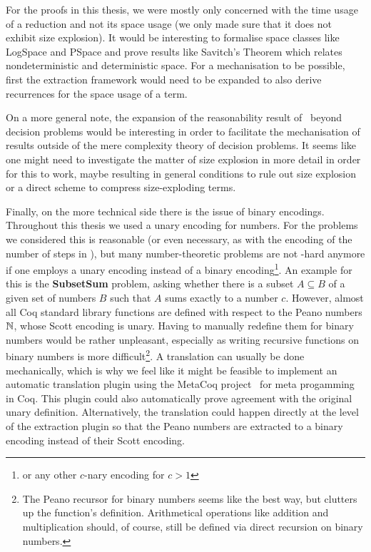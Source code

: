 For the proofs in this thesis, we were mostly only concerned with the time usage of a reduction and not its space usage (we only made sure that it does not exhibit size explosion). It would be interesting to formalise space classes like \textsf{LogSpace} and \textsf{PSpace} and prove results like Savitch's Theorem which relates nondeterministic and deterministic space. For a mechanisation to be possible, first the extraction framework would need to be expanded to also derive recurrences for the space usage of a term.

On a more general note, the expansion of the reasonability result of~\cite{ForsterKunzeRoth:2019:wcbv-Reasonable} beyond decision problems would be interesting in order to facilitate the mechanisation of results outside of the mere complexity theory of decision problems. It seems like one might need to investigate the matter of size explosion in more detail in order for this to work, maybe resulting in general conditions to rule out size explosion or a direct scheme to compress size-exploding terms.

Finally, on the more technical side there is the issue of binary encodings. Throughout this thesis we used a unary encoding for numbers. For the problems we considered this is reasonable (or even necessary, as with the encoding of the number of steps in \gennp{}), but many number-theoretic problems are not \NP{}-hard anymore if one employs a unary encoding instead of a binary encoding\footnote{or any other $c$-nary encoding for $c> 1$}. An example for this is the \textbf{SubsetSum} problem, asking whether there is a subset $A \subseteq B$ of a given set of numbers $B$ such that $A$ sums exactly to a number $c$.
However, almost all Coq standard library functions are defined with respect to the Peano numbers $\mathbb{N}$, whose Scott encoding is unary.
Having to manually redefine them for binary numbers would be rather unpleasant, especially as writing recursive functions on binary numbers is more difficult\footnote{The Peano recursor for binary numbers seems like the best way, but clutters up the function's definition. Arithmetical operations like addition and multiplication should, of course, still be defined via direct recursion on binary numbers.}.
A translation can usually be done mechanically, which is why we feel like it might be feasible to implement an automatic translation plugin using the MetaCoq project~\cite{metacoq_web} for meta progamming in Coq. This plugin could also automatically prove agreement with the original unary definition.
Alternatively, the translation could happen directly at the level of the extraction plugin so that the Peano numbers are extracted to a binary encoding instead of their Scott encoding. 
